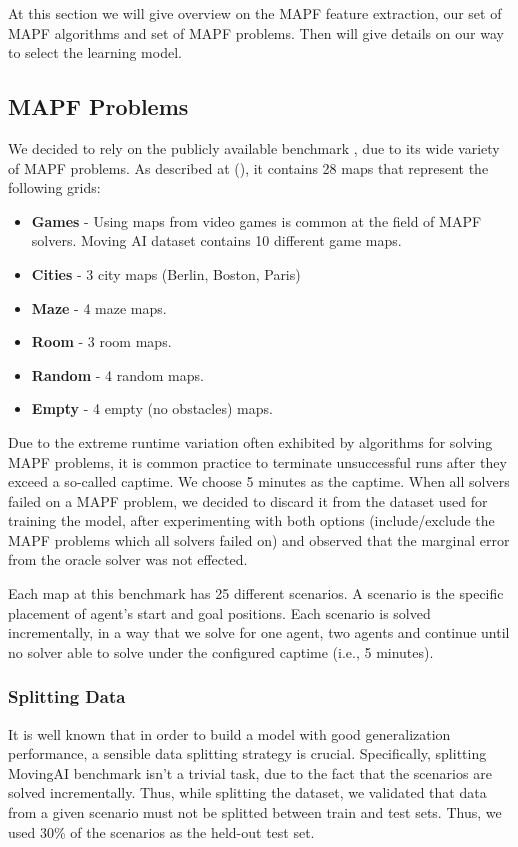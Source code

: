 \documentclass[letterpaper]{article} %
\begin{document}
At this section we will give overview on the MAPF feature extraction, our set of MAPF algorithms and set of MAPF problems. Then will give details on our way to select the learning model.

\subsection{MAPF Problems}
We decided to rely on the publicly available benchmark \footnotemark, due to its wide variety of MAPF problems. As described at (\cite{sturtevant2012benchmarks}), it contains 28 maps that represent the following grids:
\begin{itemize}
  \item \textbf{Games} - Using maps from video games is common at the field of MAPF solvers. Moving AI dataset contains 10 different game maps.
  \item \textbf{Cities} - 3 city maps (Berlin, Boston, Paris)
  \item \textbf{Maze} - 4 maze maps.
  \item \textbf{Room} - 3 room maps.
  \item \textbf{Random} - 4 random maps.
  \item \textbf{Empty} - 4 empty (no obstacles) maps.
\end{itemize}

Due to the extreme runtime variation often exhibited by algorithms for solving MAPF problems, it is common practice to terminate unsuccessful runs after they exceed a so-called captime.
We choose 5 minutes as the captime.
When all solvers failed on a MAPF problem, we decided to discard it from the dataset used for training the model, after experimenting with both options (include/exclude the MAPF problems which all solvers failed on) and observed that the marginal error from the oracle solver was not effected.

Each map at this benchmark has 25 different scenarios. A scenario is the specific placement of agent's start and goal positions. Each scenario is solved incrementally, in a way that we solve for one agent, two agents and continue until no solver able to solve under the configured captime (i.e., 5 minutes).

\subsubsection{Splitting Data}
It is well known that in order to build a model with good generalization performance, a sensible data splitting strategy is crucial. Specifically, splitting MovingAI benchmark isn't a trivial task, due to the fact that the scenarios are solved incrementally. Thus, while splitting the dataset, we validated that data from a given scenario must not be splitted between train and test sets. Thus, we used 30\% of the scenarios as the held-out test set.
\end{document}
